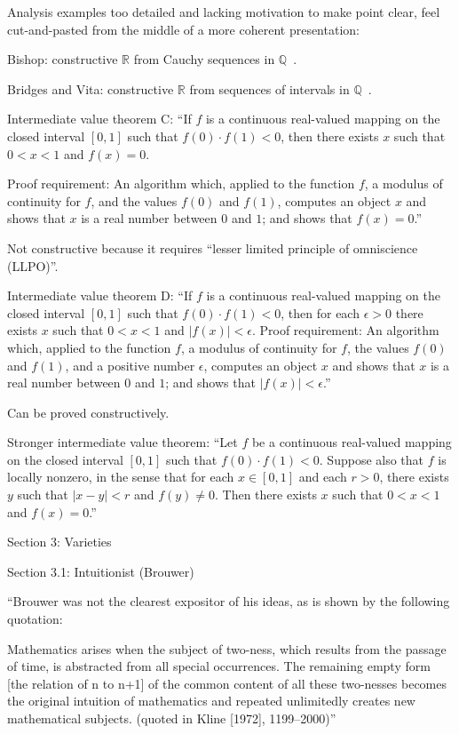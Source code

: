 Analysis examples too detailed and lacking motivation 
to make point clear, feel cut-and-pasted from the middle
of a more coherent presentation:

Bishop: constructive $\mathbb{R}$ 
from Cauchy sequences 
in $\mathbb{Q}$~\cite{bishop1985constructive}.

Bridges and Vita: constructive $\mathbb{R}$ from sequences
of intervals in $\mathbb{Q}$~\cite{Bridger:2019}.

Intermediate value theorem C: 
``If $f$ is a continuous real-valued mapping 
on the closed interval $[0,1]$ such that $f(0)⋅f(1)<0$, 
then there exists $x$ such that $0<x<1$ and $f(x)=0$.

Proof requirement: 
An algorithm which, applied to the function $f$, 
a modulus of continuity for $f$, and the values $f(0)$ and $f(1)$,
computes an object $x$ and shows that $x$ is a real number 
between $0$ and $1$; and
shows that $f(x)=0$.''~\cite{sep:mathematics_constructive}

Not constructive because it requires
``lesser limited principle of omniscience (LLPO)''.

Intermediate value theorem D:
``If $f$ is a continuous real-valued mapping 
on the closed interval $[0,1]$ 
such that $f(0)⋅f(1)<0$, 
then for each $\epsilon>0$ 
there exists $x$ such that $0<x<1$ and $|f(x)|<\epsilon$.
Proof requirement: 
An algorithm which, applied to the function $f$, 
a modulus of continuity for $f$, the values $f(0)$ and $f(1)$, 
and a positive number $\epsilon$,
computes an object $x$ 
and shows that $x$ is a real number between $0$ and $1$; and
shows that $|f(x)|<\epsilon$.''~\cite{sep:mathematics_constructive}

Can be proved constructively.

Stronger intermediate value theorem:
``Let $f$ be a continuous real-valued mapping 
on the closed interval $[0,1]$ 
such that $f(0)⋅f(1)<0$. 
Suppose also that $f$ is locally nonzero, 
in the sense that for each $x \in [0,1]$
and each $r>0$, 
there exists $y$ such that $|x−y|<r$ and $f(y) \neq 0$. 
Then there exists $x$ such that $0<x<1$ and $f(x)=0$.''

Section 3: Varieties

Section 3.1: Intuitionist (Brouwer)

``Brouwer was not the clearest expositor of his ideas, 
as is shown by the following quotation:

Mathematics arises when the subject of two-ness, 
which results from the passage of time, 
is abstracted from all special occurrences. 
The remaining empty form [the relation of n to n+1] 
of the common content of all these two-nesses 
becomes the original intuition of mathematics 
and repeated unlimitedly creates new mathematical subjects. 
(quoted in Kline [1972], 1199–2000)''

